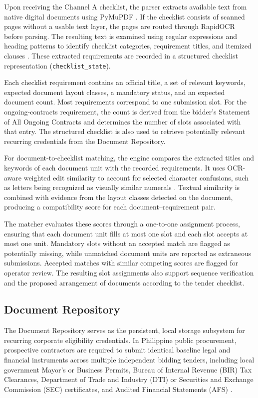 Upon receiving the Channel A checklist, the parser extracts available text from native digital documents using PyMuPDF \cite{ref40}. If the checklist consists of scanned pages without a usable text layer, the pages are routed through RapidOCR before parsing. The resulting text is examined using regular expressions and heading patterns to identify checklist categories, requirement titles, and itemized clauses \cite{ref25,ref26}. These extracted requirements are recorded in a structured checklist representation (\texttt{checklist\_state}).

Each checklist requirement contains an official title, a set of relevant keywords, expected document layout classes, a mandatory status, and an expected document count. Most requirements correspond to one submission slot. For the ongoing-contracts requirement, the count is derived from the bidder's Statement of All Ongoing Contracts and determines the number of slots associated with that entry. The structured checklist is also used to retrieve potentially relevant recurring credentials from the Document Repository.

For document-to-checklist matching, the engine compares the extracted titles and keywords of each document unit with the recorded requirements. It uses OCR-aware weighted edit similarity to account for selected character confusions, such as letters being recognized as visually similar numerals \cite{docxb1}. Textual similarity is combined with evidence from the layout classes detected on the document, producing a compatibility score for each document--requirement pair.

The matcher evaluates these scores through a one-to-one assignment process, ensuring that each document unit fills at most one slot and each slot accepts at most one unit. Mandatory slots without an accepted match are flagged as potentially missing, while unmatched document units are reported as extraneous submissions. Accepted matches with similar competing scores are flagged for operator review. The resulting slot assignments also support sequence verification and the proposed arrangement of documents according to the tender checklist.

\subsection{Document Repository}
The Document Repository serves as the persistent, local storage subsystem for recurring corporate eligibility credentials.
In Philippine public procurement, prospective contractors are required to submit identical baseline legal and financial instruments across multiple independent bidding tenders, including local government Mayor's or Business Permits, Bureau of Internal Revenue (BIR) Tax Clearances, Department of Trade and Industry (DTI) or Securities and Exchange Commission (SEC) certificates, and Audited Financial Statements (AFS) \cite{ref1, ref46}.

